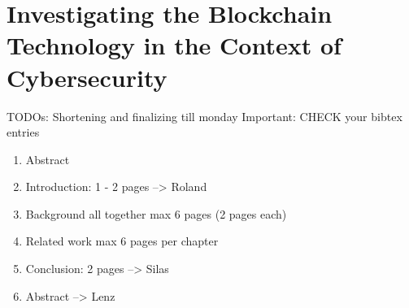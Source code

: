 \chapter{Investigating the Blockchain Technology
  in the Context of Cybersecurity}




TODOs:
Shortening and finalizing till monday
Important: CHECK your bibtex entries
\begin{enumerate}
	\item Abstract
	\item Introduction: 1 - 2 pages --> Roland
	\item Background all together max 6 pages (2 pages each)
	\item Related work max 6 pages per chapter
	\item Conclusion: 2 pages --> Silas
	\item Abstract --> Lenz
\end{enumerate}


\newpage

\minitoc %

\newpage


\newpage


\newpage


\newpage



\nocite{*}


